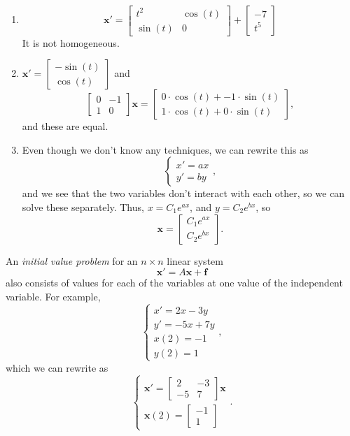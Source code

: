 \documentclass[12pt]{amsart}
\numberwithin{equation}{section}
\theoremstyle{plain} %
\theoremstyle{definition}
\theoremstyle{remark}
\begin{document}
\begin{framed}
\begin{enumerate}
\item \[ \mathbf{x'} = \begin{bmatrix} t^2 & \cos(t) \\ \sin(t) & 0 \end{bmatrix} +\begin{bmatrix} -7 \\ t^5 \end{bmatrix}\]
It is not homogeneous.
\item $\mathbf{x'} = \begin{bmatrix}  -\sin(t) \\  \cos(t)  \end{bmatrix}$ and \[ \begin{bmatrix} 0 & -1 \\ 1 & 0\end{bmatrix} \mathbf{x} = \begin{bmatrix} 0 \cdot \cos(t) + -1 \cdot \sin(t) \\ 1 \cdot \cos(t) + 0 \cdot \sin(t)\end{bmatrix},\] and these are equal.
\item Even though we don't know any techniques, we can rewrite this as 
\[  \begin{cases} x' = ax \\ y' = by\end{cases},\]
and we see that the two variables don't interact with each other, so we can solve these separately. Thus, $x= C_1 e^{ax}$, and $y= C_2 e^{bx}$, so
\[ \mathbf{x} =  \begin{bmatrix}  C_1 e^{ax} \\  C_2 e^{bx}  \end{bmatrix}.\]
\end{enumerate}
\end{framed}

An \emph{initial value problem} for an $n\times n$ linear system 
\[ \mathbf{x'} = A \mathbf{x} + \mathbf{f}\] 
also consists of values for each of the variables at one value of the independent variable. For example,
\[ \begin{cases} x' = 2x - 3y \\ y' = -5x + 7y \\ x(2) = -1\\ y(2) = 1\end{cases}, \]
which we can rewrite as
\[  \begin{cases} \mathbf{x'}  = \begin{bmatrix} 2 & - 3 \\  -5 & 7\end{bmatrix} \mathbf{x}\\
\mathbf{x}(2) = \begin{bmatrix} -1 \\ 1 \end{bmatrix}\end{cases}. \]
\end{document}
